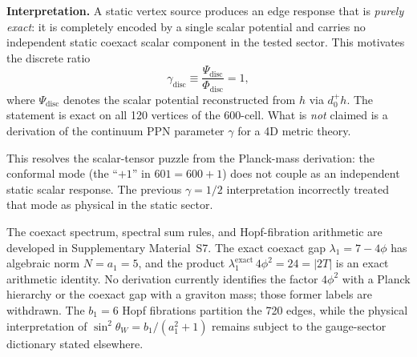 \documentclass[12pt,a4paper]{article}
\theoremstyle{definition}
\begin{document}
\textbf{Interpretation.}  A static vertex source produces an edge response that
is \emph{purely exact}: it is completely encoded by a single scalar potential
and carries no independent static coexact scalar component in the tested
sector.  This motivates the discrete ratio
\begin{equation}
\gamma_{\mathrm{disc}} \equiv \frac{\Psi_{\mathrm{disc}}}{\Phi_{\mathrm{disc}}}
= 1,
\end{equation}
where $\Psi_{\mathrm{disc}}$ denotes the scalar potential reconstructed from
$h$ via $d_0^+ h$.  The statement is exact on all 120 vertices of the 600-cell.
What is \emph{not} claimed is a derivation of the continuum PPN parameter
$\gamma$ for a 4D metric theory.

This resolves the scalar-tensor puzzle from the Planck-mass derivation: the
conformal mode (the ``$+1$'' in $601 = 600 + 1$) does not couple as an
independent static scalar response.  The previous $\gamma = 1/2$ interpretation
incorrectly treated that mode as physical in the static sector.

The coexact spectrum, spectral sum rules, and Hopf-fibration arithmetic are developed in Supplementary Material~S7.  The exact coexact gap $\lambda_1=7-4\phi$ has algebraic norm $N=a_1=5$, and the product $\lambda_1^{\mathrm{exact}}\,4\phi^2=24=|2T|$ is an exact arithmetic identity.  No derivation currently identifies the factor $4\phi^2$ with a Planck hierarchy or the coexact gap with a graviton mass; those former labels are withdrawn.  The $b_1=6$ Hopf fibrations partition the 720 edges, while the physical interpretation of $\sin^2\theta_W=b_1/(a_1^2+1)$ remains subject to the gauge-sector dictionary stated elsewhere.
\end{document}

